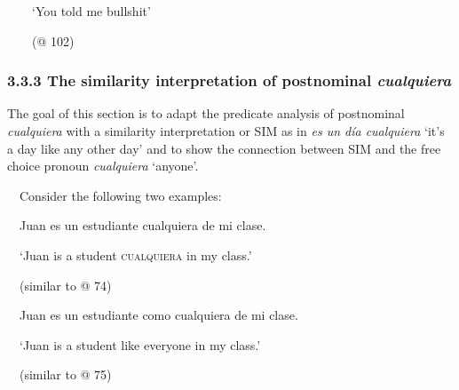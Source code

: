 \begin{styleStandard}
\ \ \ \ ‘You told me bullshit’\ \ 
\end{styleStandard}

\begin{styleStandard}
\ \ \ \ (@ 102)
\end{styleStandard}

\subsubsection[3.3.3 The similarity interpretation of postnominal cualquiera]{\textbf{3.3.3 The similarity interpretation of postnominal }\textbf{\textit{cualquiera}}}
\begin{styleStandard}
The goal of this section is to adapt the predicate analysis of postnominal \textit{cualquiera} with a similarity interpretation or SIM as in \textit{es un día cualquiera} ‘it’s a day like any other day’ and to show the connection between SIM and the free choice pronoun \textit{cualquiera} ‘anyone’. \ \ 
\end{styleStandard}

\begin{styleStandard}
\ \ Consider the following two examples:
\end{styleStandard}

\begin{styleStandard}
\label{bkm:Ref72353992}\ \ Juan es un estudiante cualquiera de mi clase.
\end{styleStandard}

\begin{styleStandard}
\ \ ‘Juan is a student \textsc{cualquiera} in my class.’
\end{styleStandard}

\begin{styleStandard}
\ \ (similar to @ 74)
\end{styleStandard}

\begin{styleStandard}
\label{bkm:Ref72354006}\ \ Juan es un estudiante como cualquiera de mi clase.
\end{styleStandard}

\begin{styleStandard}
\ \ ‘Juan is a student like everyone in my class.’
\end{styleStandard}

\begin{styleStandard}
\ \ (similar to @ 75)
\end{styleStandard}

